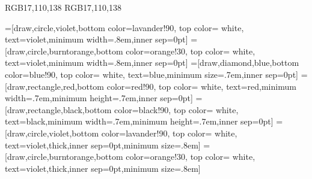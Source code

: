 \usepackage{amsmath}
\usepackage{amsfonts}
\usepackage{amssymb}
\usepackage[english]{babel}
\usepackage{graphicx}
\usepackage{tikz}
\usepackage{pgfplots}
\usepackage{cases}
\usepackage{subfig}
\usepackage{float}
\usepackage{cite}
\usepackage{algorithmic}
\usepackage{filecontents}
\usepackage{pstool}
\usepackage{booktabs}
\usepackage{pdflscape}


\usetikzlibrary{patterns,topaths,positioning,calc,arrows,shapes,backgrounds,shapes.geometric,plotmarks,decorations.pathreplacing,decorations.markings,shapes.misc,shadows,dsp}
\usepackage{hf-tikz}
\usetikzlibrary{matrix}
\usetikzlibrary{external} 
\tikzexternalize[prefix=./images/pdf/] 


\pgfplotsset{compat/show suggested version=false}

\newlength\figureheight 
\newlength\figurewidth 


\def\lav{lavander!90}
\def\oran{orange!30}
\def\dgree{dgreen!90}
\definecolor{blue_kuleuven}		{RGB}{17,110,138}	
\definecolor{bk}		{RGB}{17,110,138}	
%


=[draw,circle,violet,bottom color=\lav,
                  top color= white, text=violet,minimum width=.8em,inner sep=0pt]
=[draw,circle,burntorange,bottom color=\oran,
                  top color= white, text=violet,minimum width=.8em,inner sep=0pt]
=[draw,diamond,blue,bottom color=blue!90,
                  top color= white, text=blue,minimum size=.7em,inner sep=0pt]
=[draw,rectangle,red,bottom color=red!90,
                  top color= white, text=red,minimum width=.7em,minimum height=.7em,inner sep=0pt]
=[draw,rectangle,black,bottom color=black!90,
                  top color= white, text=black,minimum width=.7em,minimum height=.7em,inner sep=0pt]
=[draw,circle,violet,bottom color=\lav,
                  top color= white, text=violet,thick,inner sep=0pt,minimum size=.8em]
=[draw,circle,burntorange,bottom color=\oran,
                  top color= white, text=violet,thick,inner sep=0pt,minimum size=.8em]



